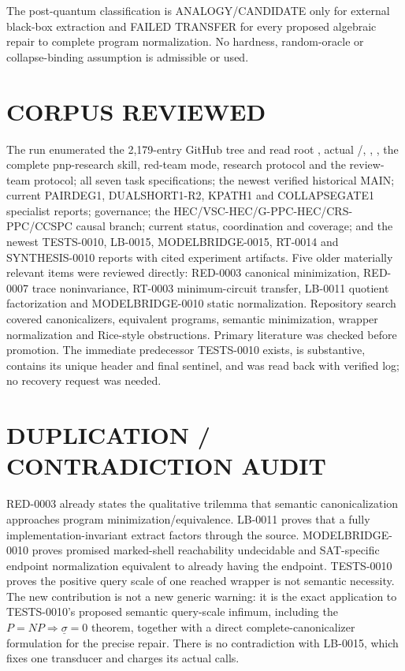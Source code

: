 \documentclass[11pt]{article}
\begin{document}
The post-quantum classification is ANALOGY/CANDIDATE only for external
black-box extraction and FAILED TRANSFER for every proposed algebraic repair
to complete program normalization.  No hardness, random-oracle or
collapse-binding assumption is admissible or used.

\section{CORPUS REVIEWED}

The run enumerated the 2,179-entry GitHub tree and read root
, actual /,
, , the complete pnp-research skill,
red-team mode, research protocol and the review-team protocol; all seven task
specifications; the newest verified historical MAIN; current PAIRDEG1,
DUALSHORT1-R2, KPATH1 and COLLAPSEGATE1 specialist reports; governance; the
HEC/VSC-HEC/G-PPC-HEC/CRS-PPC/CCSPC causal branch; current status,
coordination and coverage; and the newest TESTS-0010, LB-0015,
MODELBRIDGE-0015, RT-0014 and SYNTHESIS-0010 reports with cited experiment
artifacts.  Five older materially relevant items were reviewed directly:
RED-0003 canonical minimization, RED-0007 trace noninvariance, RT-0003
minimum-circuit transfer, LB-0011 quotient factorization and MODELBRIDGE-0010
static normalization.  Repository search covered canonicalizers, equivalent
programs, semantic minimization, wrapper normalization and Rice-style
obstructions.  Primary literature was checked before promotion.  The
immediate predecessor TESTS-0010 exists, is substantive, contains its unique
header and final sentinel, and was read back with verified log; no recovery
request was needed.

\section{DUPLICATION / CONTRADICTION AUDIT}

RED-0003 already states the qualitative trilemma that semantic
canonicalization approaches program minimization/equivalence.  LB-0011 proves
that a fully implementation-invariant extract factors through the source.
MODELBRIDGE-0010 proves promised marked-shell reachability undecidable and
SAT-specific endpoint normalization equivalent to already having the
endpoint.  TESTS-0010 proves the positive query scale of one reached wrapper
is not semantic necessity.  The new contribution is not a new generic warning:
it is the exact application to TESTS-0010's proposed semantic query-scale
infimum, including the $P=NP\Rightarrow\underline\sigma=0$ theorem, together
with a direct complete-canonicalizer formulation for the precise repair.
There is no contradiction with LB-0015, which fixes one transducer and charges
its actual calls.
\end{document}
